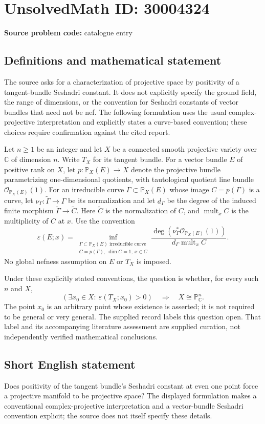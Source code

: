 \documentclass[11pt]{article}
\newcommand{\C}{\mathbb{C}}
\newcommand{\PP}{\mathbb{P}}
\begin{document}
\section*{UnsolvedMath ID: 30004324}
\textbf{Source problem code:} catalogue entry
\subsection{Definitions and mathematical statement}
The source asks for a characterization of projective space by positivity of a tangent-bundle Seshadri constant. It does not explicitly specify the ground field, the range of dimensions, or the convention for Seshadri constants of vector bundles that need not be nef. The following formulation uses the usual complex-projective interpretation and explicitly states a curve-based convention; these choices require confirmation against the cited report.

Let \(n\geq 1\) be an integer and let \(X\) be a connected smooth projective variety over \(\C\) of dimension \(n\). Write \(T_X\) for its tangent bundle. For a vector bundle \(E\) of positive rank on \(X\), let \(p:\PP_X(E)\to X\) denote the projective bundle parametrizing one-dimensional quotients, with tautological quotient line bundle \(\mathcal O_{\PP_X(E)}(1)\). For an irreducible curve \(\Gamma\subset\PP_X(E)\) whose image \(C=p(\Gamma)\) is a curve, let \(\nu_\Gamma:\widetilde\Gamma\to\Gamma\) be its normalization and let \(d_\Gamma\) be the degree of the induced finite morphism \(\widetilde\Gamma\to\widetilde C\). Here \(\widetilde C\) is the normalization of \(C\), and \(\operatorname{mult}_x C\) is the multiplicity of \(C\) at \(x\). Use the convention
\[
\varepsilon(E;x)=\inf_{\substack{\Gamma\subset\PP_X(E)\text{ irreducible curve}\\ C=p(\Gamma),\ \dim C=1,\ x\in C}}
\frac{\deg\!\left(\nu_\Gamma^*\mathcal O_{\PP_X(E)}(1)\right)}{d_\Gamma\operatorname{mult}_x C}.
\]
No global nefness assumption on \(E\) or \(T_X\) is imposed.

Under these explicitly stated conventions, the question is whether, for every such \(n\) and \(X\),
\[
\left(\exists x_0\in X:\ \varepsilon(T_X;x_0)>0\right)
\quad\Longrightarrow\quad
X\cong\PP^n_{\C}.
\]
The point \(x_0\) is an arbitrary point whose existence is asserted; it is not required to be general or very general. The supplied record labels this question open. That label and its accompanying literature assessment are supplied curation, not independently verified mathematical conclusions.
\subsection{Short English statement}
Does positivity of the tangent bundle's Seshadri constant at even one point force a projective manifold to be projective space? The displayed formulation makes a conventional complex-projective interpretation and a vector-bundle Seshadri convention explicit; the source does not itself specify these details.
\end{document}
